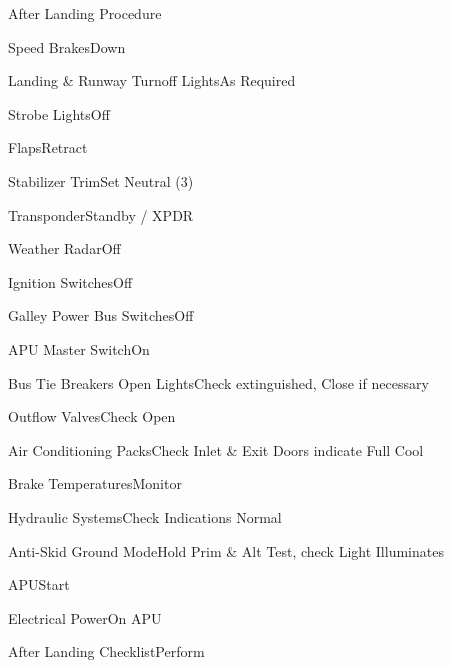 \documentclass[sim-use, blue_items]{checklist}
\begin{document}
\begin{checklist}{After Landing Procedure} %
	\item{Speed Brakes}{Down}
	\item{Landing \& Runway Turnoff Lights}{As Required}
	\item{Strobe Lights}{Off}
	\item{Flaps}{Retract}
	\item{Stabilizer Trim}{Set Neutral (3)}
	\item{Transponder}{Standby / XPDR}
	\item{Weather Radar}{Off} %
	\item{Ignition Switches}{Off}
	\item{Galley Power Bus Switches}{Off}
	\item{APU Master Switch}{On}
	\item{Bus Tie Breakers Open Lights}{Check extinguished, Close if necessary}
	\item{Outflow Valves}{Check Open}
	\item{Air Conditioning Packs}{Check Inlet \& Exit Doors indicate Full Cool}
	\item{Brake Temperatures}{Monitor}
	\item{Hydraulic Systems}{Check Indications Normal}
	\item{Anti-Skid Ground Mode}{Hold Prim \& Alt Test, check Light Illuminates}
	\item{APU}{Start}
	\item{Electrical Power}{On APU}
	\item{After Landing Checklist}{Perform}
\end{checklist}
\end{document}
